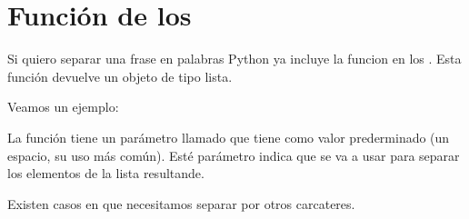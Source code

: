 \documentclass[a5paper,9pt,spanish]{sphinxmanual}
\begin{document}
\section{Función  de los }
\label{\detokenize{list:funcion-split-de-los-strings}}
\sphinxAtStartPar
Si quiero separar una frase en palabras Python ya incluye la funcion  en
los . Esta función devuelve un objeto de tipo lista.

\sphinxAtStartPar
Veamos un ejemplo:

\begin{sphinxVerbatim}[commandchars=\\\{\}]
  
  
\PYG{p}{[}            \PYG{p}{]}
\end{sphinxVerbatim}

\sphinxAtStartPar
La función  tiene un parámetro llamado  que tiene como valor prederminado
 (un espacio, su uso más común). Esté parámetro indica que  se va a usar para
separar los elementos de la lista resultande.

\sphinxAtStartPar
Existen casos en que necesitamos separar por otros carcateres.
\end{document}
